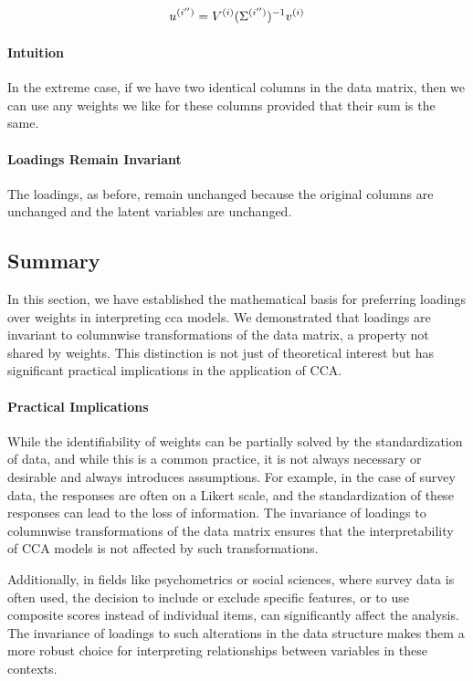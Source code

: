\begin{align}
    u^{(i'')} = V^{(i)}(\Sigma^{(i'')})^{-1}v^{(i)} \label{eq:weights_change}
\end{align}

\paragraph{Intuition}
In the extreme case, if we have two identical columns in the data matrix, then we can use any weights we like for these columns provided that their sum is the same.

\paragraph{Loadings Remain Invariant}
The loadings, as before, remain unchanged because the original columns are unchanged and the latent variables are unchanged.

\subsection{Summary}

In this section, we have established the mathematical basis for preferring \gls{loadings} over weights in interpreting \acrshort{cca} models.
We demonstrated that \gls{loadings} are invariant to columnwise transformations of the data matrix, a property not shared by weights.
This distinction is not just of theoretical interest but has significant practical implications in the application of CCA.

\paragraph{Practical Implications}

While the identifiability of weights can be partially solved by the standardization of data, and while this is a common practice, it is not always necessary or desirable and always introduces assumptions. For example, in the case of survey data, the responses are often on a Likert scale, and the standardization of these responses can lead to the loss of information. The invariance of \gls{loadings} to columnwise transformations of the data matrix ensures that the interpretability of CCA models is not affected by such transformations.

Additionally, in fields like psychometrics or social sciences, where survey data is often used, the decision to include or exclude specific features, or to use composite scores instead of individual items, can significantly affect the analysis. The invariance of \gls{loadings} to such alterations in the data structure makes them a more robust choice for interpreting relationships between variables in these contexts.

